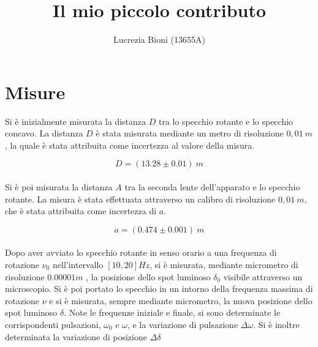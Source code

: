 \documentclass{article} %
\title{Il mio piccolo contributo} %
\author{Lucrezia Bioni (13655A)} %
\date{} %
\let\oldsection\section%
\renewcommand{\section}{%
	\renewcommand{\theequation}{\thesection.\arabic{equation}}%
	\oldsection}%
\begin{document}
    \maketitle
    \section{Misure} %
    
    Si è inizialmente misurata la distanza $D$ tra lo specchio rotante e lo specchio concavo. La distanza $D$ è stata misurata 
    mediante un metro di risoluzione $ 0,01 \ m $, la quale è stata attribuita come incertezza al valore della misura.

    \begin{equation}
        \tag{3.1}
        D = (13.28 \pm 0.01) \ m
    \end{equation} \\
    Si è poi misurata la distanza $A$ tra la seconda lente dell'apparato e lo specchio rotante. La misura è stata effettuata
    attraverso un calibro di risoluzione $ 0,01 \ m $, che è stata attribuita come incertezza di $a$.
    
    \begin{equation}
        \tag{3.2}
        a = (0.474 \pm 0.001) \ m
    \end{equation} \\
    Dopo aver avviato lo specchio rotante in senso orario a una frequenza di rotazione $ \nu_0 $ nell'intervallo $[10,20] Hz$,
    si è misurata, mediante micrometro di risoluzione $ 0.00001 m $ , la posizione dello spot luminoso $\delta_0$ visibile attraverso
    un microscopio. Si è poi portato lo specchio in un intorno della frequenza massima di rotazione $ \nu $ e si è misurata,
    sempre mediante micrometro, la nuova posizione dello spot luminoso $\delta$. Note le frequenze iniziale e finale, si sono
    determinate le corrispondenti pulsazioni, $\omega_0$ e $\omega$, e la variazione di pulsazione $\Delta\omega$. Si è inoltre
    determinata la variazione di posizione $\Delta\delta$
    
\end{document}
